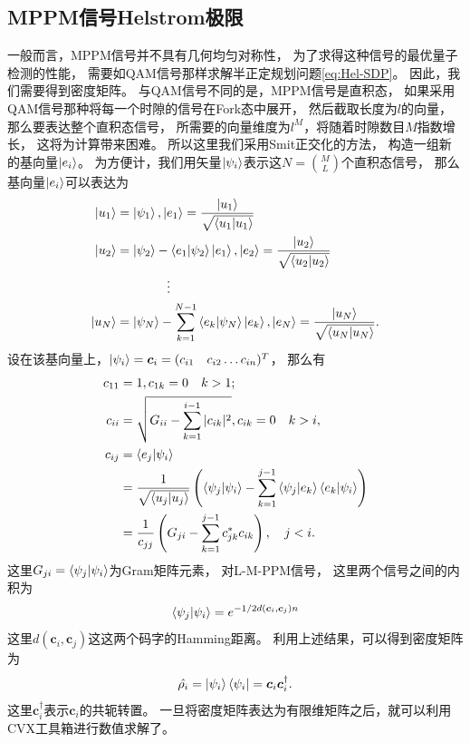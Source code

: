 \subsection{MPPM信号Helstrom极限}
一般而言，MPPM信号并不具有几何均匀对称性，
为了求得这种信号的最优量子检测的性能，
需要如QAM信号那样求解半正定规划问题\ref{eq:Hel-SDP}。
因此，我们需要得到密度矩阵。
与QAM信号不同的是，MPPM信号是直积态，
如果采用QAM信号那种将每一个时隙的信号在Fork态中展开，
然后截取长度为$l$的向量，那么要表达整个直积态信号，
所需要的向量维度为$l^M$，将随着时隙数目$M$指数增长，
这将为计算带来困难。
所以这里我们采用Smit正交化的方法\cite{lzw2010LA,zyh2007szjsff}，
构造一组新的基向量$\ket{e_i}$。
为方便计，我们用矢量$\ket{\psi_i}$表示这$N = \binom{M}{L}$个直积态信号，
那么基向量$\ket{e_i}$可以表达为
\begin{equation}
\begin{split}
\ket{u_1} &= \ket{\psi_1}, \ket{e_1} = \frac{\ket{u_1}}{\sqrt{\bra{u_1}\ket{u_1}}}\\
\ket{u_2} &= \ket{\psi_2} - \bra{e_1}\ket{\psi_2}\ket{e_1}, \ket{e_2} = \frac{\ket{u_2}}{\sqrt{\bra{u_2}\ket{u_2}}}\\
          &\qquad\qquad \vdots \\
\ket{u_N} &= \ket{\psi_N} - \sum_{k=1}^{N-1} \bra{e_k}\ket{\psi_N}\ket{e_k}, \ket{e_N} = \frac{\ket{u_N}}{\sqrt{\bra{u_N}\ket{u_N}}}.
\end{split}
\end{equation}
设在该基向量上，$\ket{\psi_i} =\bm{c}_i = (c_{i1} \quad c_{i2} \dots c_{in})^T$，
那么有
\begin{equation}
\begin{split}
c_{11} &= 1, c_{1k}=0 \quad k>1; \\
c_{ii} &= \sqrt{G_{ii} - \sum_{k=1}^{i-1} |c_{ik}|^2 }, c_{ik}=0 \quad k>i, \\
c_{ij} &= \bra{e_j}\ket{\psi_i} \\
       &= \frac{1}{\sqrt{\bra{u_j}\ket{u_j}}} \left( \bra{\psi_j}\ket{\psi_i} - \sum_{k=1}^{j-1} \bra{\psi_j}\ket{e_k} \bra{e_k}\ket{\psi_i} \right)\\
       &= \frac{1}{c_{jj}} \left( G_{ji} - \sum_{k=1}^{j-1} c_{jk}^* c_{ik} \right), \quad j<i.
\end{split}
\end{equation}
这里$G_{ji}=\bra{\psi_j}\ket{\psi_i}$为Gram矩阵元素，
对L-M-PPM信号，
这里两个信号之间的内积为
\begin{equation}
\bra{\psi_j}\ket{\psi_i}=e^{-1/2 d(\bm{c}_i, \bm{c}_j) n}
\end{equation}
这里$d(\bm{c}_i, \bm{c}_j)$这这两个码字的Hamming距离。
利用上述结果，可以得到密度矩阵为
\begin{equation}
\hat{\rho_i} = \ket{\psi_i}\bra{\psi_i} = \bm{c}_i \bm{c}_i^\dagger.
\end{equation}
这里$\bm{c}_i^\dagger$表示$\bm{c}_i$的共轭转置。
一旦将密度矩阵表达为有限维矩阵之后，就可以利用CVX工具箱\cite{cvx,gb08}进行数值求解了。

